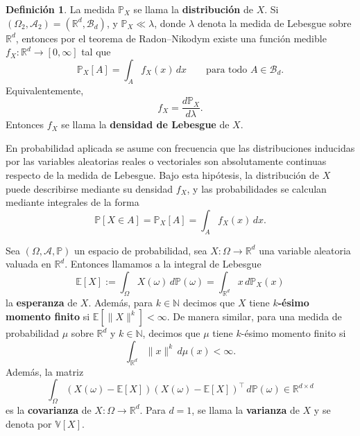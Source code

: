 \documentclass[11pt]{report}
\newenvironment{tcolorbox}[1][]{\par\medskip\noindent\ignorespaces}{\par\medskip}
\theoremstyle{definition}
\newtheorem{definicion}{Definición}[section]
\theoremstyle{plain}
\numberwithin{equation}{section}
\begin{document}
\begin{tcolorbox}[colback=blue!8, colframe=blue!8, boxrule=0pt]
\begin{definicion}
La medida \(\mathbb{P}_X\) se llama la \textbf{distribución} de \(X\). Si \((\Omega_2,\mathcal{A}_2)=(\mathbb{R}^d,\mathcal{B}_d)\), y \(\mathbb{P}_X\ll\lambda\), donde \(\lambda\) denota la medida de Lebesgue sobre \(\mathbb{R}^d\), entonces por el teorema de Radon--Nikodym existe una función medible \(f_X:\mathbb{R}^d\to[0,\infty]\) tal que
\begin{equation*}
    \mathbb{P}_X[A]
    =
    \int_A f_X(x)\,dx
    \qquad
    \text{para todo } A\in\mathcal{B}_d.
\end{equation*}
Equivalentemente,
\begin{equation*}
    f_X
    =
    \frac{d\mathbb{P}_X}{d\lambda}.
\end{equation*}
Entonces \(f_X\) se llama la \textbf{densidad de Lebesgue} de \(X\).

En probabilidad aplicada se asume con frecuencia que las distribuciones inducidas por las variables aleatorias reales o vectoriales son absolutamente continuas respecto de la medida de Lebesgue. Bajo esta hipótesis, la distribución de \(X\) puede describirse mediante su densidad \(f_X\), y las probabilidades se calculan mediante integrales de la forma
\begin{equation*}
    \mathbb{P}[X\in A]
    =
    \mathbb{P}_X[A]
    =
    \int_A f_X(x)\,dx.
\end{equation*}
\end{definicion}
\end{tcolorbox}

Sea \((\Omega,\mathcal{A},\mathbb{P})\) un espacio de probabilidad, sea \(X:\Omega\to\mathbb{R}^d\) una variable aleatoria valuada en \(\mathbb{R}^d\). Entonces llamamos a la integral de Lebesgue
\begin{equation*}
    \mathbb{E}[X]
    :=
    \int_\Omega X(\omega)\,d\mathbb{P}(\omega)
    =
    \int_{\mathbb{R}^d} x\,d\mathbb{P}_X(x)
    \tag{A.2.1}
\end{equation*}
la \textbf{esperanza} de \(X\). Además, para \(k\in\mathbb{N}\) decimos que \(X\) tiene \textbf{\(k\)-ésimo momento finito} si \(\mathbb{E}[\|X\|^k]<\infty\). De manera similar, para una medida de probabilidad \(\mu\) sobre \(\mathbb{R}^d\) y \(k\in\mathbb{N}\), decimos que \(\mu\) tiene \(k\)-ésimo momento finito si
\begin{equation*}
    \int_{\mathbb{R}^d} \|x\|^k\,d\mu(x)<\infty.
\end{equation*}
Además, la matriz
\begin{equation*}
    \int_\Omega
    (X(\omega)-\mathbb{E}[X])
    (X(\omega)-\mathbb{E}[X])^\top
    \,d\mathbb{P}(\omega)
    \in\mathbb{R}^{d\times d}
\end{equation*}
es la \textbf{covarianza} de \(X:\Omega\to\mathbb{R}^d\). Para \(d=1\), se llama la \textbf{varianza} de \(X\) y se denota por \(\mathbb{V}[X]\).
\end{document}
